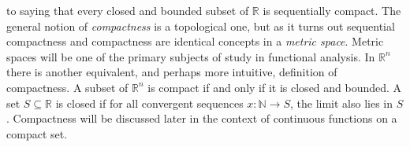         to saying that every closed and bounded subset
        of $\mathbb{R}$ is sequentially
        compact. The general notion of \textit{compactness}
        is a topological one, but as it turns out
        sequential compactness and compactness are
        identical concepts in a \textit{metric space}.
        Metric spaces will be one of the primary
        subjects of study in functional analysis.
        In $\mathbb{R}^{n}$ there is another equivalent,
        and perhaps more intuitive,
        definition of compactness. A subset of
        $\mathbb{R}^{n}$ is compact if and only if it
        is closed and bounded. A set
        $S\subseteq\mathbb{R}$ is closed if for
        all convergent sequences
        $x:\mathbb{N}\rightarrow{S}$,
        the limit also lies in $S$.
        Compactness will be discussed later in the
        context of continuous functions on a compact set.

